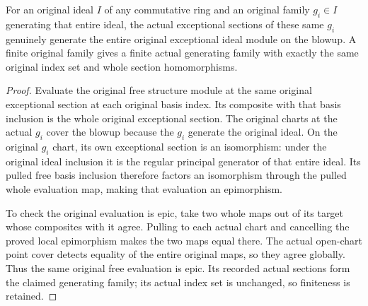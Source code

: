 \begin{lemma}
\label{lem:kn-nadel-nef-big-exceptional-generators}
\leanok
{}
For an original ideal $I$ of any commutative ring and an original family
$g_i\in I$ generating that entire ideal, the actual exceptional sections
of these same $g_i$ genuinely generate the entire original exceptional
ideal module on the blowup. A finite original family gives a finite
actual generating family with exactly the same original index set and
whole section homomorphisms.
\end{lemma}
\begin{proof}
Evaluate the original free structure module at the same original
exceptional section at each original basis index. Its composite with
that basis inclusion is the whole original exceptional section. The
original charts at the actual $g_i$ cover the blowup because the $g_i$
generate the original ideal. On the original $g_i$ chart, its own
exceptional section is an isomorphism: under the original ideal
inclusion it is the regular principal generator of that entire ideal.
Its pulled free basis inclusion therefore factors an isomorphism through
the pulled whole evaluation map, making that evaluation an epimorphism.

To check the original evaluation is epic, take two whole maps out of its
target whose composites with it agree. Pulling to each actual chart and
cancelling the proved local epimorphism makes the two maps equal there.
The actual open-chart point cover detects equality of the entire original
maps, so they agree globally. Thus the same original free evaluation is
epic. Its recorded actual sections form the claimed generating family;
its actual index set is unchanged, so finiteness is retained.
\end{proof}

